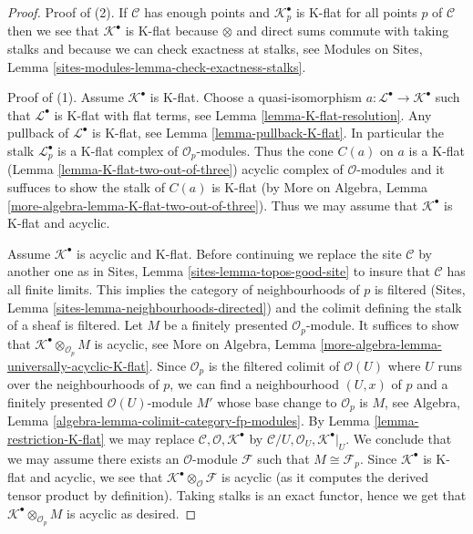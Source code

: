 \begin{proof}
Proof of (2). If $\mathcal{C}$ has enough points and
$\mathcal{K}_p^\bullet$ is K-flat for all points $p$ of $\mathcal{C}$
then we see that $\mathcal{K}^\bullet$ is K-flat because $\otimes$ and
direct sums commute with taking stalks and because we can check exactness
at stalks, see
Modules on Sites, Lemma \ref{sites-modules-lemma-check-exactness-stalks}.

\medskip\noindent
Proof of (1). Assume $\mathcal{K}^\bullet$ is K-flat.
Choose a quasi-isomorphism $a : \mathcal{L}^\bullet \to \mathcal{K}^\bullet$
such that $\mathcal{L}^\bullet$ is K-flat with flat terms, see
Lemma \ref{lemma-K-flat-resolution}. Any pullback
of $\mathcal{L}^\bullet$ is K-flat, see
Lemma \ref{lemma-pullback-K-flat}. In particular the stalk
$\mathcal{L}_p^\bullet$ is a K-flat complex of $\mathcal{O}_p$-modules.
Thus the cone $C(a)$ on $a$ is a K-flat
(Lemma \ref{lemma-K-flat-two-out-of-three})
acyclic complex of $\mathcal{O}$-modules and it suffuces
to show the stalk of $C(a)$ is K-flat
(by More on Algebra, Lemma \ref{more-algebra-lemma-K-flat-two-out-of-three}).
Thus we may assume that $\mathcal{K}^\bullet$ is K-flat and acyclic.

\medskip\noindent
Assume $\mathcal{K}^\bullet$ is acyclic and K-flat. Before continuing
we replace the site $\mathcal{C}$ by another one as in
Sites, Lemma \ref{sites-lemma-topos-good-site}
to insure that $\mathcal{C}$ has all finite
limits. This implies the category of neighbourhoods of $p$ is filtered
(Sites, Lemma \ref{sites-lemma-neighbourhoods-directed})
and the colimit defining the stalk of a sheaf is filtered.
Let $M$ be a finitely presented $\mathcal{O}_p$-module.
It suffices to show that $\mathcal{K}^\bullet \otimes_{\mathcal{O}_p} M$
is acyclic, see
More on Algebra, Lemma \ref{more-algebra-lemma-universally-acyclic-K-flat}.
Since $\mathcal{O}_p$ is the filtered colimit of $\mathcal{O}(U)$
where $U$ runs over the neighbourhoods of $p$, we
can find a neighbourhood $(U, x)$ of $p$ and a finitely
presented $\mathcal{O}(U)$-module $M'$ whose base change
to $\mathcal{O}_p$ is $M$, see
Algebra, Lemma \ref{algebra-lemma-colimit-category-fp-modules}.
By Lemma \ref{lemma-restriction-K-flat}
we may replace $\mathcal{C}, \mathcal{O}, \mathcal{K}^\bullet$
by $\mathcal{C}/U, \mathcal{O}_U, \mathcal{K}^\bullet|_U$.
We conclude that we may assume there exists an $\mathcal{O}$-module
$\mathcal{F}$ such that $M \cong \mathcal{F}_p$.
Since $\mathcal{K}^\bullet$ is K-flat and acyclic,
we see that $\mathcal{K}^\bullet \otimes_\mathcal{O} \mathcal{F}$
is acyclic (as it computes the derived tensor product by
definition). Taking stalks is an exact functor, hence we get that
$\mathcal{K}^\bullet \otimes_{\mathcal{O}_p} M$
is acyclic as desired.
\end{proof}

